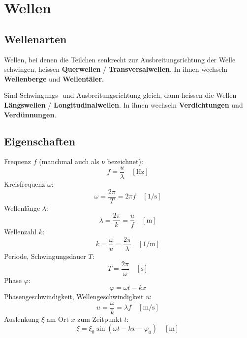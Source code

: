 \section{Wellen}

\subsection{Wellenarten}

Wellen, bei denen die Teilchen senkrecht zur Ausbreitungsrichtung der Welle
schwingen, heissen \textbf{Querwellen} / \textbf{Transversalwellen}. In ihnen
wechseln \textbf{Wellenberge} und \textbf{Wellentäler}.


Sind Schwingungs- und Ausbreitungsrichtung gleich, dann heissen die Wellen
\textbf{Längswellen} / \textbf{Longitudinalwellen}. In ihnen wechseln
\textbf{Verdichtungen} und \textbf{Verdünnungen}.


\subsection{Eigenschaften}



Frequenz $f$ (manchmal auch als $\nu$ bezeichnet):
\[
	f = \frac{u}{\lambda}
	\quad \left[ \textrm{Hz} \right]
\]
Kreisfrequenz $\omega$:
\[
	\omega = \frac{2 \pi}{T} = 2 \pi f
	\quad \left[ 1/\textrm{s} \right]
\]
Wellenlänge $\lambda$:
\[
	\lambda = \frac{2 \pi}{k} = \frac{u}{f}
	\quad \left[ \textrm{m} \right]
\]
Wellenzahl $k$:
\[
	k = \frac{\omega}{u} = \frac{2 \pi}{\lambda}
	\quad \left[ 1/\textrm{m} \right]
\]
Periode, Schwingungsdauer $T$:
\[
	T = \frac{2 \pi}{\omega}
	\quad \left[ \textrm{s} \right]
\]
Phase $\varphi$:
\[
	\varphi = \omega t - k x
\]
Phasengeschwindigkeit, Wellengeschwindigkeit $u$:
\[
	u = \frac{\omega}{k} = \lambda f
	\quad \left[ \textrm{m} / \textrm{s} \right]
\]
Auslenkung $\xi$ am Ort $x$ zum Zeitpunkt $t$:
\[
	\xi = \xi_0 \sin (\omega t - k x - \varphi_0)
	\quad \left[ \textrm{m} \right]
\]


